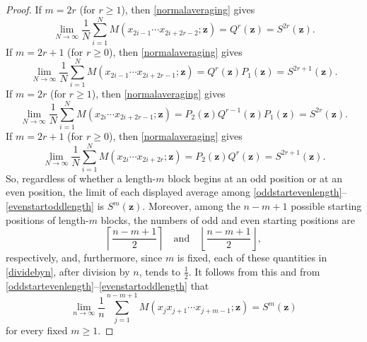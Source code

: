 \documentclass[10pt,a4paper]{amsart}
\begin{document}
\begin{proof}
 If $m=2r$ (for $r \geq 1$), then \eqref{normalaveraging} gives 
\begin{equation}\label{oddstartevenlength}
 \lim_{N\to\infty}\frac{1}{N}
 \sum_{i=1}^{N}
 M(x_{2i-1}\cdots x_{2i+2r-2};\mathbf z) 
 = Q^r(\mathbf z) 
 = S^{2r}(\mathbf z).
\end{equation}
 If $m=2r+1$ (for $r \geq 0$), then \eqref{normalaveraging} gives 
\begin{equation}%
 \lim_{N\to\infty}\frac{1}{N}
 \sum_{i=1}^{N}
 M(x_{2i-1}\cdots x_{2i+2r-1};\mathbf z) 
 =Q^r(\mathbf z) P_1(\mathbf z)
 = S^{2r+1}(\mathbf z).
\end{equation}
 If $m=2r$ (for $r \geq 1$), then \eqref{normalaveraging} gives 
\begin{equation}%
 \lim_{N\to\infty}\frac{1}{N}
 \sum_{i=1}^{N}
 M(x_{2i}\cdots x_{2i+2r-1};\mathbf z) 
 = P_2(\mathbf z) Q^{r-1}(\mathbf z) P_1(\mathbf z)
 = S^{2r}(\mathbf z). 
\end{equation} 
 If $m=2r+1$ (for $r \geq 0$), then \eqref{normalaveraging} gives 
\begin{equation}\label{evenstartoddlength}
 \lim_{N\to\infty}\frac{1}{N}
 \sum_{i=1}^{N}
 M(x_{2i}\cdots x_{2i+2r};\mathbf z) 
 = P_2(\mathbf z) Q^r(\mathbf z) 
 = S^{2r+1}(\mathbf z).
\end{equation} 
 So, regardless of whether a length-$m$ block begins at an odd position or at an even position, the limit of each 
 displayed average among \eqref{oddstartevenlength}--\eqref{evenstartoddlength} 
 is $S^m(\mathbf z)$.  Moreover, among 
 the $n-m+1$ possible starting positions of length-$m$ blocks, the numbers of odd and 
 even starting positions are 
\begin{equation}\label{dividebyn} 
 \left\lceil\frac{n-m+1}{2}\right\rceil
 \quad\text{and}\quad
 \left\lfloor\frac{n-m+1}{2}\right\rfloor, 
\end{equation}
 respectively, and, furthermore, since $m$ is fixed, each of these quantities in \eqref{dividebyn}, after division by $n$,
tends to $\frac{1}{2}$. It follows from this and from 
 \eqref{oddstartevenlength}--\eqref{evenstartoddlength} that 
\begin{equation}\label{allstartpositions}
 \lim_{n\to\infty}\frac{1}{n}
 \sum_{j=1}^{n-m+1}M(x_jx_{j+1}\cdots x_{j+m-1};\mathbf z)
 = S^m(\mathbf z) 
\end{equation}
 for every fixed $m\geq1$. 


\end{proof}
\end{document}
